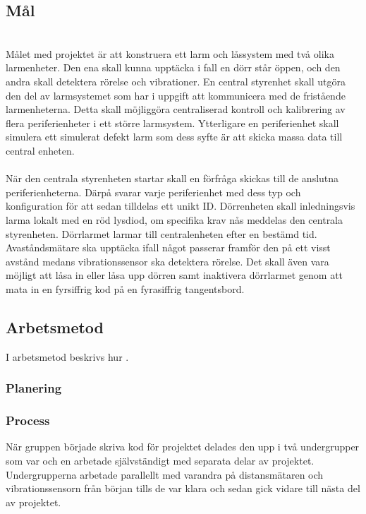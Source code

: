 \documentclass{article}
\begin{document}
\subsection{Mål}
\\
Målet med projektet är att konstruera ett larm och låssystem med två olika larmenheter. Den ena skall kunna upptäcka i fall en dörr står öppen, och den andra skall detektera rörelse och vibrationer. 
En central styrenhet skall utgöra den del av larmsystemet som har i uppgift att kommunicera med de fristående larmenheterna.
Detta skall möjliggöra centraliserad kontroll och kalibrering av flera periferienheter i ett större larmsystem.
Ytterligare en periferienhet skall simulera ett simulerat defekt larm som dess syfte är att skicka massa data till central enheten.
\\
\\
När den centrala styrenheten startar skall en förfråga skickas till de anslutna periferienheterna. Därpå svarar varje periferienhet med dess typ och konfiguration för att sedan tilldelas ett unikt ID. Dörrenheten skall inledningsvis larma lokalt med en röd lysdiod, om specifika krav nås meddelas den centrala styrenheten. Dörrlarmet larmar till centralenheten efter en bestämd tid. Avaståndsmätare ska upptäcka ifall något passerar framför den på ett visst avstånd medans vibrationssensor ska detektera rörelse. Det skall även vara möjligt att låsa in eller låsa upp dörren samt inaktivera dörrlarmet genom att mata in en fyrsiffrig kod på en fyrasiffrig tangentsbord.


\subsection{Arbetsmetod}
I arbetsmetod beskrivs hur .

\subsubsection{Planering}

\subsubsection{Process}
När gruppen började skriva kod för projektet delades den upp i två undergrupper som var och en arbetade självständigt med separata delar av projektet. 
Undergrupperna arbetade parallellt med varandra på distansmätaren och vibrationssensorn från början tills de var klara och sedan gick vidare till nästa del av projektet.
\end{document}

